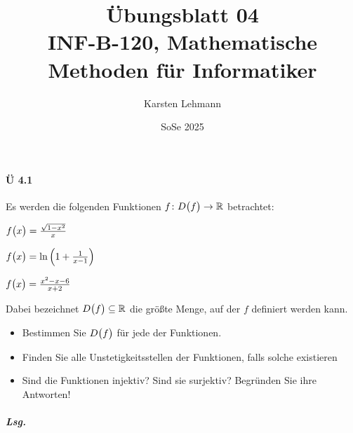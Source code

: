 \documentclass{scrreprt}
\author{Karsten Lehmann}
\date{SoSe 2025}
\title{Übungsblatt 04\\INF-B-120, Mathematische Methoden für Informatiker}
\begin{document}
\paragraph{Ü 4.1} Es werden die folgenden Funktionen
$f \colon D\qty\big(f) \to \mathbb{R}$ betrachtet:

\begin{enumerate*}[(a)]
\item $f\qty\big(x) = \frac{\sqrt{1 - x^2}}{x}$
\item $f\qty\big(x) = \ln\qty(1 + \frac{1}{x - 1})$
\item $f\qty\big(x) = \frac{x^2 - x - 6}{x + 2}$
\end{enumerate*}

Dabei bezeichnet $D\qty\big(f) \subseteq \mathbb{R}$ die größte Menge, auf der
$f$ definiert werden kann.

\begin{itemize}
\item Bestimmen Sie $D\qty\big(f)$ für jede der Funktionen.
\item Finden Sie alle Unstetigkeitsstellen der Funktionen, falls solche existieren
\item Sind die Funktionen injektiv?
  Sind sie surjektiv?
  Begründen Sie ihre Antworten!
\end{itemize}

\subparagraph{Lsg.}
\end{document}
